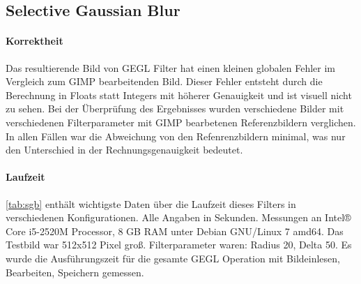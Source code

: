 \documentclass[10pt,a4paper]{article}
\begin{document}





\subsection{Selective Gaussian Blur}
\paragraph{Korrektheit}
Das resultierende Bild von GEGL Filter hat einen kleinen globalen Fehler im Vergleich zum GIMP bearbeitenden Bild. Dieser Fehler entsteht durch die Berechnung in Floats statt Integers mit höherer Genauigkeit und ist visuell nicht zu sehen. Bei der Überprüfung des Ergebnisses wurden verschiedene Bilder mit verschiedenen Filterparameter mit GIMP bearbetenen Referenzbildern verglichen. In allen Fällen war die Abweichung von den Refenrenzbildern minimal, was nur den Unterschied in der Rechnungsgenauigkeit bedeutet.

\paragraph{Laufzeit}
\autoref{tab:sgb} enthält wichtigste Daten über die Laufzeit dieses Filters in verschiedenen Konfigurationen. Alle Angaben in Sekunden. Messungen an Intel® Core i5-2520M Processor, 8 GB RAM unter Debian GNU/Linux 7 amd64. Das Testbild war 512x512 Pixel groß. Filterparameter waren: Radius 20, Delta 50. Es wurde die Ausführungszeit für die gesamte GEGL Operation mit Bildeinlesen, Bearbeiten, Speichern gemessen.
\end{document}
